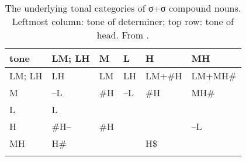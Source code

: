 \begin{refsection}
\begin{subtables}
	\label{tab:abstractcompoundsREF}
	
	\begin{table}%
	\small
		\caption{\label{tab:abstractmonosyllabicmonosyllablesREF}The underlying tonal categories of σ+σ compound
			nouns. Leftmost column: tone of determiner; top row: tone of head. From .}
		{\renewcommand{\arraystretch}{1.35}
			\begin{tabularx}{\textwidth}{ Q  Q  Q  Q  Q  Q }
				\lsptoprule
				tone & LM; LH & M & L & H & MH\\ \midrule
				LM; LH & LH & LM & LH & LM+\#H & LM+MH\#\\
				M & --L & \#H & --L & \#H & MH\#\\
				L & L &  &  &  & \hspace*{\fill}\\
				H & \#H-- & \#H &  &
				\hspace*{\fill} & --L\\
				MH & H\# &  &  \hspace*{\fill} & H\$ & \hspace*{\fill}\\
				\lspbottomrule
			\end{tabularx}}
		\end{table}
		

\end{subtables}
\end{refsection}
